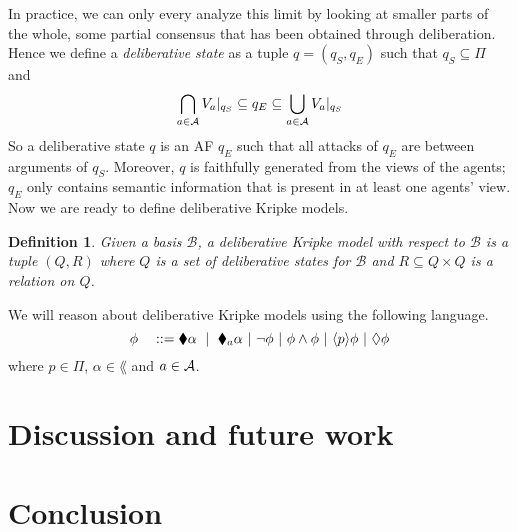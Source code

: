 \documentclass{article}
\newtheorem{definition}[thm]{Definition}
\newcommand{\views}{\mathcal B}
\begin{document}
In practice, we can only every analyze this limit by looking at smaller parts of the whole, some partial consensus that has been obtained through deliberation. Hence we define a \emph{deliberative state} as a tuple $q = (q_S,q_E)$ such that $q_S \subseteq \Pi$ and 
\begin{equation}\label{eq:ds}
\bigcap_{a \in \mathcal A}{V_a}|_{q_S} \subseteq q_E \subseteq \bigcup_{a\in \mathcal A} {V_a}|_{q_S}
\end{equation}
So a deliberative state $q$ is an AF $q_E$ such that all attacks of $q_E$ are between arguments of $q_S$. Moreover, $q$ is faithfully generated from the views of the agents; $q_E$ only contains semantic information that is present in at least one agents' view. Now we are ready to define deliberative Kripke models.

\begin{definition}\label{main}
Given a basis $\views$, a deliberative Kripke model with respect to $\views$ is a tuple $(Q,R)$ where $Q$ is a set of deliberative states for $\views$ and $R \subseteq Q \times Q$ is a relation on $Q$.
\end{definition}
We will reason about deliberative Kripke models using the following language.
$$ \phi \quad ::= \cdia \alpha \ \mid \ \cdia_a \alpha ~|~ \neg \phi ~|~ \phi \wedge \phi ~|~ \ddia p \phi ~|~ \adia \phi$$ 
where $p \in \Pi$, $\alpha \in \lang$ and $a \in \mathcal A$.

\section{Discussion and future work}\label{sec:fut}

\section{Conclusion}\label{sec:conc}
\end{document}
